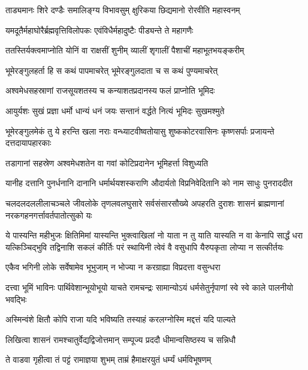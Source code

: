 \twolineshloka
{ताड्यमानः शिरे दण्डैः समालिङ्ग्य विभावसुम्}
{क्षुरिकया छिद्यमानो रोरवीति महास्वनम्}%

\twolineshloka
{यमदूतैर्महाघोरैर्ब्रह्मवृत्तिविलोपकः}
{एवंविधैर्महादुष्टैः पीड्यन्ते ते महागणैः}%

\twolineshloka
{ततस्तिर्यक्त्वमाप्नोति योनिं वा राक्षसीं शुनीम्}
{व्यालीं शृगालीं पैशाचीं महाभूतभयङ्करीम्}%

\twolineshloka
{भूमेरङ्गुलहर्ता हि स कथं पापमाचरेत्}
{भूमेरङ्गुलदाता च स कथं पुण्यमाचरेत्}%

\twolineshloka
{अश्वमेधसहस्राणां राजसूयशतस्य च}
{कन्याशतप्रदानस्य फलं प्राप्नोति भूमिदः}%

\twolineshloka
{आयुर्यशः सुखं प्रज्ञा धर्मो धान्यं धनं जयः}
{सन्तानं वर्द्धते नित्यं भूमिदः सुखमश्मुते}%

\threelineshloka
{भूमेरङ्गुलमेकं तु ये हरन्ति खला नराः}
{वन्ध्याटवीष्वतोयासु शुष्ककोटरवासिनः}
{कृष्णसर्पाः प्रजायन्ते दत्तदायापहारकाः}%

\twolineshloka
{तडागानां सहस्रेण अश्वमेधशतेन वा}
{गवां कोटिप्रदानेन भूमिहर्त्ता विशुध्यति}%

\twolineshloka
{यानीह दत्तानि पुनर्धनानि दानानि धर्मार्थयशस्कराणि}
{औदार्यतो विप्रनिवेदितानि को नाम साधुः पुनराददीत}%

\twolineshloka
{चलदलदललीलाचञ्चले जीवलोके तृणलवलघुसारे सर्वसंसारसौख्ये}
{अपहरति दुराशः शासनं ब्राह्मणानां नरकगहनगर्त्तावर्तपातोत्सुको यः}%

\twolineshloka
{ये पास्यन्ति महीभुजः क्षितिमिमां यास्यन्ति भुक्त्वाखिलां नो याता न तु याति यास्यति न वा केनापि सार्द्धं धरा}
{यत्किञ्चिद्भुवि तद्विनाशि सकलं कीर्तिः परं स्थायिनी त्वेवं वै वसुधापि यैरुपकृता लोप्या न सत्कीर्तयः}%

\twolineshloka
{एकैव भगिनी लोके सर्वेषामेव भूभुजाम्}
{न भोज्या न करग्राह्या विप्रदत्ता वसुन्धरा}%

\twolineshloka
{दत्त्वा भूमिं भाविनः पार्थिवेशान्भूयोभूयो याचते रामचन्द्रः}
{सामान्योऽयं धर्मसेतुर्नृपाणां स्वे स्वे काले पालनीयो भवद्भिः}%

\twolineshloka
{अस्मिन्वंशे क्षितौ कोपि राजा यदि भविष्यति}
{तस्याहं करलग्नोस्मि मद्दत्तं यदि पाल्यते}%

\twolineshloka
{लिखित्वा शासनं रामश्चातुर्वेद्यद्विजोत्तमान्}
{सम्पूज्य प्रददौ धीमान्वसिष्ठस्य च सन्निधौ}%

\twolineshloka
{ते वाडवा गृहीत्वा तं पट्टं रामाज्ञया शुभम्}
{ताम्रं हैमाक्षरयुतं धर्म्यं धर्मविभूषणम्}%

